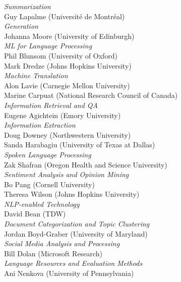 %
\emph{Summarization} \\
\hspace*{5mm} Guy Lapalme (Université de Montréal) \\
%
\emph{Generation} \\
\hspace*{5mm} Johanna Moore (University of Edinburgh) \\
%
\emph{ML for Language Processing} \\
\hspace*{5mm} Phil Blunsom (University of Oxford) \\
\hspace*{5mm} Mark Dredze (Johns Hopkins University) \\

\emph{Machine Translation} \\
\hspace*{5mm} Alon Lavie (Carnegie Mellon University) \\
\hspace*{5mm} Marine Carpuat (National Research Council of Canada) \\
%
\emph{Information Retrieval and QA} \\
\hspace*{5mm} Eugene Agichtein (Emory University) \\
%
\emph{Information Extraction} \\
\hspace*{5mm} Doug Downey (Northwestern University) \\
\hspace*{5mm} Sanda Harabagiu (University of Texas at Dallas) \\
%
\emph{Spoken Language Processing} \\
\hspace*{5mm} Zak Shafran (Oregon Health and Science University) \\
%
\emph{Sentiment Analysis and Opinion Mining} \\
\hspace*{5mm} Bo Pang (Cornell University) \\
\hspace*{5mm} Theresa Wilson (Johns Hopkins University) \\
%
\emph{NLP-enabled Technology} \\
\hspace*{5mm} David Bean (TDW) \\
%
\emph{Document Categorization and Topic Clustering} \\
\hspace*{5mm} Jordan Boyd-Graber (University of Maryland) \\
%
\emph{Social Media Analysis and Processing} \\
\hspace*{5mm} Bill Dolan (Microsoft Research) \\
%
\emph{Language Resources and Evaluation Methods} \\
\hspace*{5mm} Ani Nenkova (University of Pennsylvania)

